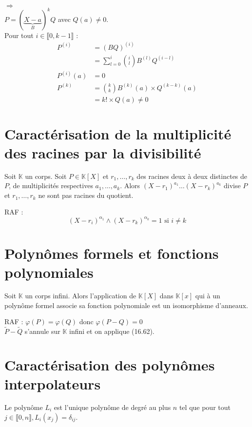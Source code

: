\documentclass[../main.tex]{subfiles}
\begin{document}
$\boxed{\Rightarrow}$ \\
$P = (\underbrace{X - a}_B)^k Q$ avec $Q(a) \neq 0$. \\
Pour tout $i \in \llbracket 0, k-1 \rrbracket$ : 
\begin{align*}
    P^{(i)} &= (BQ)^{(i)} \\
    &= \sum_{l=0}^{i} \binom{i}{l} B^{(l)} Q^{(i-l)} \\
    P^{(i)}(a) &= 0 \\
    P^{(k)} &= \binom{k}{k} B^{(k)}(a) \times Q^{(k-k)}(a) \\
    &= k! \times Q(a) \neq 0
\end{align*}

\section{Caractérisation de la multiplicité des racines par la divisibilité}
\begin{tcolorbox}[title=Théorème 16.59, title filled=false, colframe=orange, colback=orange!10!white]
    Soit $\mathbb{K}$ un corps. Soit $P \in \mathbb{K}[X]$ et $r_1, \ldots, r_k$ des racines deux à deux distinctes de $P$, de multiplicités respectives $a_1, \ldots, a_k$. Alors $(X - r_1)^{a_1} \ldots (X - r_k)^{a_k}$ divise $P$ et $r_1, \ldots, r_k$ ne sont pas racines du quotient.
\end{tcolorbox}

\noindent RAF : \\
$$(X - r_i)^{\alpha_1} \wedge (X - r_k)^{\alpha_k} = 1 \text{ si } i \neq k$$

\section{Polynômes formels et fonctions polynomiales}
\begin{tcolorbox}[title=Théorème 16.63, title filled=false, colframe=orange, colback=orange!10!white]
    Soit $\mathbb{K}$ un corps infini. Alors l'application de $\mathbb{K}[X]$ dans $\mathbb{K}[x]$ qui à un polynôme formel associe sa fonction polynomiale est un isomorphisme d'anneaux. 
\end{tcolorbox}

\noindent RAF : $\varphi(P) = \varphi(Q)$ donc $\varphi(P - Q) = 0$ \\
$\tilde{P} - \tilde{Q}$ s'annule sur $\mathbb{K}$ infini et on applique (16.62). 

\section{Caractérisation des polynômes interpolateurs}
\begin{tcolorbox}[title=Lemme 16.66, title filled=false, colframe=orange, colback=orange!10!white]
    Le polynôme $L_i$ est l'unique polynôme de degré au plus $n$ tel que pour tout $j \in \llbracket 0, n \rrbracket, L_i(x_j) = \delta_{ij}$.
\end{tcolorbox}
\end{document}
